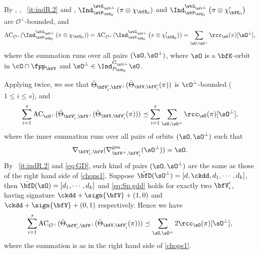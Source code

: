\documentclass[12pt,a4paper]{amsart}
\newcommand{\AC}{\mathrm{AC}}
\def\AC{\mathrm{AC}}
\newcommand{\CO}{{\mathcal {O}}}
\newcommand{\p}{\mathfrak p}
\def\DD{\nabla}
\def\gDD{\nabla^{\mathrm{gen}}}
\numberwithin{equation}{section}
\theoremstyle{remark}
\def\abfV{\bfV'}
\def\Thetab{\bar{\Theta}}
\def\KV{\bfK_{\bfV}}
\def\KV{\bfK}
\def\sOpe{\sO^\perp}
\def\bfVpe{\bfV^\perp}
\def\ssD{\ddot{\bfD}}
\begin{document}
By , , ~\ref{it:indR.2} and \cite[Theorem~1.4]{SV},
 $\Ind_{\wtP_{\bfE_0}}^{\wtG_{\bfVpe}} \left(\pi\otimes \chi_{\bfE_0}\right)$ and
  $\Ind_{\wtP_{\bfE_0}}^{\wtG_{\bfVpe}} \left(\pi\otimes \chi'_{\bfE_0}\right)$ are
$\CO^\perp$-bounded, and
  \begin{equation}
    \label{chops1}
    \AC_{\CO^\perp}(\Ind_{\wtP_{\bfE_0}}^{\wtG_{\bfVpe}} \left(\pi\otimes
      \chi_{\bfE_0}\right))
    =\AC_{\CO^\perp}(\Ind_{\wtP_{\bfE_0}}^{\wtG_{\bfV^\perp}}
    \left(\pi\otimes \chi'_{\bfE_0}\right))
    =\sum_{\sO, \sOpe}  \rcc_\sO(\pi) [\sO^\perp ],
  \end{equation}
  where the summation runs over all pairs $(\sO,\sOpe)$, where $\sO$ is a
  $\KV$-orbit in $\cO\cap \fpp_{\bfV}$ and $\sOpe\in \Ind_{P_{\bfE_0}}^{G_{\bfVpe}}\sO$.


  Applying  twice, %
    we see that $\Thetab_{\abfV_i,\bfV^\perp}(\Thetab_{\bfV,\abfV_i}(\pi))$ is
  $\cO^\perp$-bounded ($1\leq i\leq s$), and
\[
  \sum_{i=1}^s
  \AC_{\cO^\perp}(\Thetab_{\abfV_i,\bfVpe}(\Thetab_{\bfV,\abfV_i}(\pi)))\preceq\sum_{i=1}^s
  \sum_{\sO,\sOpe} \rcc_\sO(\pi) [\sO^\perp ],
\]
where the inner summation runs over all pairs of orbits $(\sO,\sOpe)$ such that
\begin{equation}\label{eq:Sp.gdd}
\DD_{\bfV_i', \bfV}(\gDD_{\bfVpe,\abfV_i}(\sOpe)) = \sO.
\end{equation}
By ~\ref{it:indR.2} and \cref{eq:GD}, such kind of
pairs $(\sO,\sOpe)$ are the same as those of the right hand side of
\eqref{chops1}. Suppose $\ssD(\sOpe) = [d,\ckdd,d_1,\cdots, d_k]$, then
$\ssD(\sO) = [d_1,\cdots, d_k]$ and \cref{eq:Sp.gdd} holds
for exactly two $\abfV_i$, having signature $\ckdd+\sign{\bfV}+(1,0)$ and
$\ckdd+\sign{\bfV}+(0,1)$ respectively. Hence we have
\begin{equation}
  \label{chops2}
  \sum_{i=1}^s \AC_{\CO^\perp}(\Thetab_{\abfV_i,\bfV^\perp}(\Thetab_{\bfV,\abfV_i}(\pi)))\preceq \sum_{\sO, \sO^\perp}
  2\rcc_\sO(\pi) [\sO^\perp ],
\end{equation}
where the summation is as in the right hand
side of \eqref{chops1}.
\end{document}
